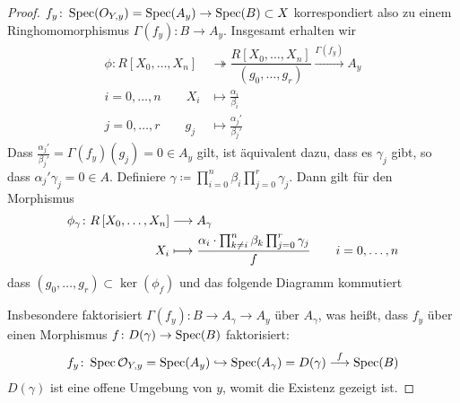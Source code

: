 \documentclass[german, bibliography=totoc]{scrreprt}
\begin{document}
\begin{Lemma}
\begin{proof}
    $f_y\colon\operatorname{Spec}(O_{Y,y})=\operatorname{Spec}(A_y)\to\operatorname{Spec}(B)\subset X$
    korrespondiert also zu einem Ringhomomorphismus
    $\Gamma(f_y)\colon B\to A_y$.
    Insgesamt erhalten wir
    \begin{align*}
      \phi\colon
      R\left[X_0,\dotsc, X_n\right]
      &\twoheadrightarrow
        \dfrac{R\left[X_0,\dotsc, X_n\right]}{\left(g_0,\dotsc, g_r\right)}
        \xrightarrow{\Gamma(f_y)}
        A_y\\
      i=0,\dotsc, n\qquad
      X_i &\longmapsto \frac{\alpha_i}{\beta_i}\\
      j=0,\dotsc, r\qquad
      g_j &\longmapsto \frac{\alpha_j'}{\beta_j'}
    \end{align*}
    Dass $\frac{\alpha_j'}{\beta_j'}=\Gamma(f_y)(g_j)=0\in A_y$ gilt,
    ist äquivalent dazu, dass es $\gamma_j$ gibt, so dass
    $\alpha_j'\gamma_j=0\in A$.
    Definiere
    $\gamma\coloneqq \prod_{i=0}^n \beta_i \prod_{j=0}^r \gamma_j$.
    Dann gilt für den Morphismus
    \begin{align*}
      \phi_\gamma\colon
      R\left[X_0,\dotsc, X_n\right]
      &\longrightarrow
        A_\gamma\\
      X_i
      &\longmapsto
        \dfrac{
        \alpha_i\cdot
        \prod_{k\neq i}^n \beta_k
        \prod_{j=0}^r \gamma_j
        }{f}
        \qquad i=0,\dotsc,n
    \end{align*}
    dass $(g_0, \dotsc, g_r)\subset\ker(\phi_f)$ und das folgende
    Diagramm kommutiert
    \begin{center}
    \end{center}
    Insbesondere faktorisiert $\Gamma(f_y)\colon B\to A_\gamma\to A_y$
    über $A_\gamma$, was heißt, dass $f_y$ über einen Morphismus
    $f\colon D(\gamma)\to\operatorname{Spec}(B)$ faktorisiert:
    \begin{gather*}
      f_y\colon
      \operatorname{Spec}\mathcal{O}_{Y,y}=\operatorname{Spec}(A_y)
      \hookrightarrow \operatorname{Spec}(A_\gamma)=D(\gamma)
      \overset{f}{\longrightarrow} \operatorname{Spec}(B)
    \end{gather*}
    $D(\gamma)$ ist eine offene Umgebung von $y$, womit die Existenz
    gezeigt ist.
  \end{proof}
\end{Lemma}
\end{document}
